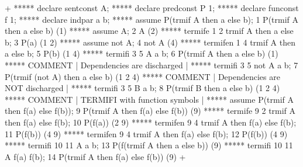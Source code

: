 \gfexample+
   ***** declare sentconst A;
   ***** declare predconst P 1;
   ***** declare funconst f 1;
   ***** declare indpar a b;
   ***** assume P(trmif A then a else b);
   1   P(trmif A then a else b)     (1)
   ***** assume A;
   2   A     (2)
   ***** termife 1 2 trmif A then a else b;
   3   P(a)     (1 2)
   ***** assume not A;
   4   not A     (4)
   ***** termifen 1 4 trmif A then a else b;
   5   P(b)     (1 4)
   ***** termifi 3 5 A a b;
   6   P(trmif A then a else b)     (1)
   ***** COMMENT | Dependencies are discharged |
   ***** termifi 3 5 not A a b;
   7   P(trmif (not A) then a else b)     (1 2 4)
   ***** COMMENT | Dependencies are NOT discharged |
   ***** termifi 3 5 B a b;
   8   P(trmif B then a else b)     (1 2 4)
   ***** COMMENT | TERMIFI with function symbols |
   ***** assume P(trmif A then f(a) else f(b));
   9   P(trmif A then f(a) else f(b))     (9)
   ***** termife 9 2 trmif A then f(a) else f(b);
   10   P(f(a))     (2 9)
   ***** termifen 9 4 trmif A then f(a) else f(b);
   11   P(f(b))     (4 9)
   ***** termifen 9 4 trmif A then f(a) else f(b);
   12   P(f(b))     (4 9)
   ***** termifi 10 11  A a b;
   13   P(f(trmif A then a else b))     (9)
   ***** termifi 10 11 A f(a) f(b);
   14   P(trmif A then f(a) else f(b))     (9)
+   
   
   